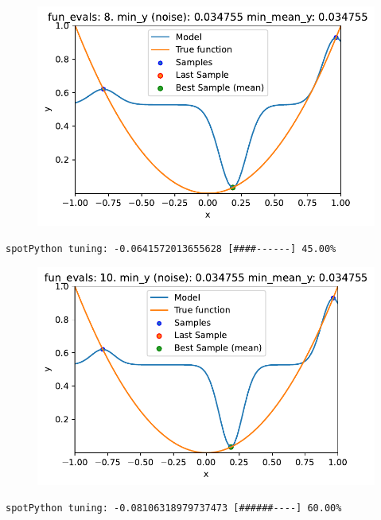 \documentclass[
  letterpaper,
  DIV=11,
  numbers=noendperiod]{scrreprt}
\begin{document}
\begin{figure}[H]

{\centering \includegraphics{014_num_spot_ocba_files/figure-pdf/cell-6-output-2.pdf}

}

\end{figure}

\begin{verbatim}
spotPython tuning: -0.0641572013655628 [####------] 45.00% 
\end{verbatim}

\begin{figure}[H]

{\centering \includegraphics{014_num_spot_ocba_files/figure-pdf/cell-6-output-4.pdf}

}

\end{figure}

\begin{verbatim}
spotPython tuning: -0.08106318979737473 [######----] 60.00% 
\end{verbatim}
\end{document}
